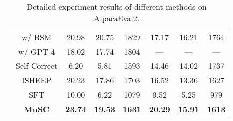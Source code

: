 \begin{table*}[ht]
{\begin{tabular}{cc|cccccc}
                                   & w/ BSM                           & 20.98            & 20.75            & 1829              & 17.17            & 16.21            & 1764              \\
                                   & w/ GPT-4                         & 18.02            & 17.74            & 1804              & —                & —                & —                 \\ \cline{2-8} 
                                   & Self-Correct                     & 6.20             & 5.81             & 1593              & 14.46            & 14.02            & 1737              \\
                                   & ISHEEP                           & 20.23            & 17.86            & 1703              & 16.52            & 13.36            & 1627              \\
                                   & SFT                              & 10.00            & 6.22             & 1079              & 9.52             & 5.25             & 979               \\ \cline{2-8} 
                                   & \textbf{MuSC}                    & \textbf{23.74}   & \textbf{19.53}   & \textbf{1631}     & \textbf{20.29}   & \textbf{15.91}   & \textbf{1613}     \\ \hline
\end{tabular}}
\caption{Detailed experiment results of different methods on AlpacaEval2.}
\label{tab:alpaca-eval}
\end{table*}

